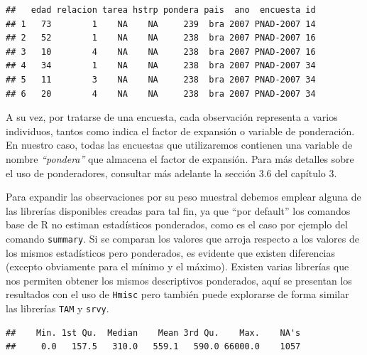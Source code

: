 \documentclass[
]{book}
\newenvironment{Shaded}{\begin{snugshade}}{\end{snugshade}}
\newcommand{\AttributeTok}[1]{\textcolor[rgb]{0.77,0.63,0.00}{#1}}
\newcommand{\CommentTok}[1]{\textcolor[rgb]{0.56,0.35,0.01}{\textit{#1}}}
\newcommand{\FunctionTok}[1]{\textcolor[rgb]{0.00,0.00,0.00}{#1}}
\newcommand{\NormalTok}[1]{#1}
\newcommand{\SpecialCharTok}[1]{\textcolor[rgb]{0.00,0.00,0.00}{#1}}
\begin{document}
\begin{verbatim}
##   edad relacion tarea hstrp pondera pais  ano  encuesta id
## 1   73        1    NA    NA     239  bra 2007 PNAD-2007 14
## 2   52        1    NA    NA     238  bra 2007 PNAD-2007 16
## 3   10        4    NA    NA     238  bra 2007 PNAD-2007 16
## 4   34        1    NA    NA     238  bra 2007 PNAD-2007 34
## 5   11        3    NA    NA     238  bra 2007 PNAD-2007 34
## 6   20        4    NA    NA     238  bra 2007 PNAD-2007 34
\end{verbatim}

A su vez, por tratarse de una encuesta, cada observación representa a varios individuos, tantos como indica el factor de expansión o variable de ponderación. En nuestro caso, todas las encuestas que utilizaremos contienen una variable de nombre \emph{``pondera''} que almacena el factor de expansión. Para más detalles sobre el uso de ponderadores, consultar más adelante la sección 3.6 del capítulo 3.

Para expandir las observaciones por su peso muestral debemos emplear alguna de las librerías disponibles creadas para tal fin, ya que ``por default'' los comandos base de R no estiman estadísticos ponderados, como es el caso por ejemplo del comando \texttt{summary}. Si se comparan los valores que arroja respecto a los valores de los mismos estadísticos pero ponderados, es evidente que existen diferencias (excepto obviamente para el mínimo y el máximo). Existen varias librerías que nos permiten obtener los mismos descriptivos ponderados, aquí se presentan los resultados con el uso de \texttt{Hmisc} pero también puede explorarse de forma similar las librerías \texttt{TAM} y \texttt{srvy}.

\begin{Shaded}
\end{Shaded}

\begin{verbatim}
##    Min. 1st Qu.  Median    Mean 3rd Qu.    Max.    NA's 
##     0.0   157.5   310.0   559.1   590.0 66000.0    1057
\end{verbatim}

\begin{Shaded}
\end{Shaded}
\end{document}
